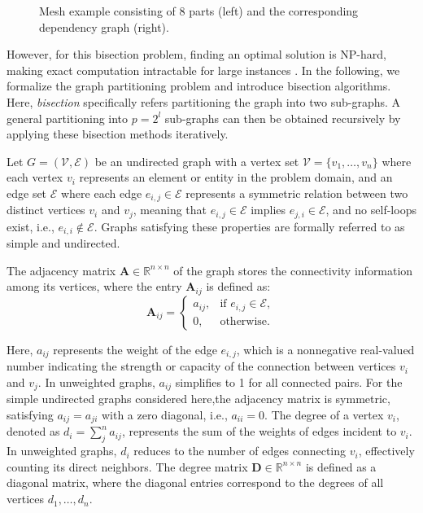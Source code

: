 \documentclass[../paper.tex]{subfiles}
\begin{document}
\begin{figure}[h!]
\begin{subfigure}[b]{0.23\textwidth}
            \caption{}
            \label{fig:graph_example}
        \end{subfigure}
        \caption{Mesh example consisting of 8 parts (left) and the corresponding
        dependency graph (right).}
        \label{fig:mesh_and_graph}
    \end{figure}
    
    
    However, for this bisection problem, finding an optimal solution is NP-hard, making exact computation intractable for large instances \cite{buluc2015recentadvancesgraphpartitioning}. In the following,
    we formalize the graph partitioning problem and introduce bisection algorithms.
    Here, \textit{bisection} specifically refers partitioning the graph into two sub-graphs.
    A general partitioning into $p = 2^l$ sub-graphs can then
    be obtained recursively by applying these bisection methods iteratively.
    
    Let $G=(\mathcal{V}, \mathcal{E})$ be an undirected graph with a vertex set 
    $\mathcal{V}=\{ v_1, \dots, v_n \}$ where each vertex $v_i$ represents
    an element or entity in the problem domain, and an edge set $\mathcal{E}$
    where each edge $e_{i, j} \in \mathcal{E}$ represents a symmetric relation between
    two distinct vertices $v_i$ and $v_j$, meaning that
    $e_{i, j} \in \mathcal{E}$ implies $e_{j, i} \in \mathcal{E}$, and no self-loops exist, i.e., $e_{i, i} \notin \mathcal{E}$. Graphs satisfying these properties are formally referred to as simple and undirected.
    
    The adjacency matrix $\mathbf{A} \in \mathbb{R}^{n \times n}$ of the graph
    stores the connectivity information among its vertices, where the entry
    $\mathbf{A}_{ij}$ is defined as:
    \begin{equation}
      \mathbf{A}_{ij} =
        \begin{cases}
            a_{ij}, & \text{if } e_{i,j} \in \mathcal{E},\\
            0, & \text{otherwise}.
        \end{cases}
    \end{equation}
    
    Here, $a_{ij}$ represents the weight of the edge $e_{i,j}$, which is a nonnegative real-valued number indicating the strength or capacity of the connection
    between vertices $v_i$ and $v_j$. In unweighted graphs, $a_{ij}$ simplifies to 1 for all connected pairs.
    For the simple undirected graphs considered here,the adjacency matrix is symmetric, satisfying $a_{ij} = a_{ji}$ with a zero diagonal, i.e., $a_{ii} = 0$.
    The degree of a vertex $v_i$, denoted as $d_i = \sum^n_j a_{ij}$, represents the sum of the weights of edges incident to $v_i$. In unweighted graphs, $d_i$ reduces to the number of edges connecting $v_i$, effectively counting its direct
    neighbors. The degree matrix $\mathbf{D} \in \mathbb{R}^{n \times n}$ is defined
    as a diagonal matrix, where the diagonal entries correspond to the degrees of all vertices $d_1, \dots, d_n$.
    
\end{document}
